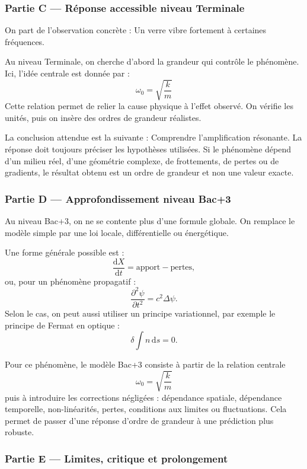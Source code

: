 \documentclass[11pt,a4paper]{article}
\begin{document}
\subsubsection*{Partie C — Réponse accessible niveau Terminale}

\begin{corrigebox}
On part de l'observation concrète : Un verre vibre fortement à certaines fréquences.

Au niveau Terminale, on cherche d'abord la grandeur qui contrôle le phénomène. Ici, l'idée centrale est donnée par :
\[
\omega_0=\sqrt{\frac{k}{m}}
\]
Cette relation permet de relier la cause physique à l'effet observé. On vérifie les unités, puis on insère des ordres de grandeur réalistes.

La conclusion attendue est la suivante : Comprendre l'amplification résonante. La réponse doit toujours préciser les hypothèses utilisées. Si le phénomène dépend d'un milieu réel, d'une géométrie complexe, de frottements, de pertes ou de gradients, le résultat obtenu est un ordre de grandeur et non une valeur exacte.
\end{corrigebox}

\subsubsection*{Partie D — Approfondissement niveau Bac+3}

\begin{approfondissementbox}
Au niveau Bac+3, on ne se contente plus d'une formule globale. On remplace le modèle simple par une loi locale, différentielle ou énergétique.

Une forme générale possible est :
\[
\frac{\mathrm d X}{\mathrm dt}=\text{apport}-\text{pertes},
\]
ou, pour un phénomène propagatif :
\[
\frac{\partial^2 \psi}{\partial t^2}=c^2\Delta\psi.
\]
Selon le cas, on peut aussi utiliser un principe variationnel, par exemple le principe de Fermat en optique :
\[
\delta \int n\,\mathrm ds=0.
\]

Pour ce phénomène, le modèle Bac+3 consiste à partir de la relation centrale
\[
\omega_0=\sqrt{\frac{k}{m}}
\]
puis à introduire les corrections négligées : dépendance spatiale, dépendance temporelle, non-linéarités, pertes, conditions aux limites ou fluctuations. Cela permet de passer d'une réponse d'ordre de grandeur à une prédiction plus robuste.
\end{approfondissementbox}

\subsubsection*{Partie E — Limites, critique et prolongement}
\end{document}
